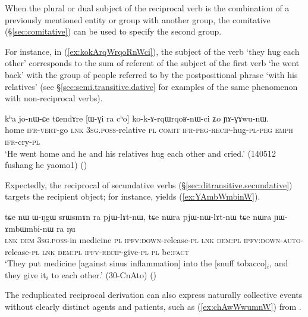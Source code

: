 When the plural or dual subject of the reciprocal verb is the combination of a previously mentioned entity or group with another group, the comitative  (§\ref{sec:comitative})  can be used to specify the second group. 

For instance, in (\ref{ex:kokArqWrqoRnWci}), the subject of the verb  `they hug each other' corresponds to the sum of referent of the subject of the first verb  `he went back' with the group of people referred to by the postpositional phrase  `with his relatives' (see §\ref{sec:semi.transitive.dative} for examples of the same phenomenon with non-reciprocal verbs).

\begin{exe}
\ex \label{ex:kokArqWrqoRnWci}
\gll   kʰa jo-nɯ-ɕe tɕendɤre [ɯ-ɣi ra cʰo] ko-k-ɤ-rqɯ\redp{}rqoʁ-nɯ-ci ʑo ɲɤ-ɣɤwu-nɯ. \\
home \textsc{ifr}-\textsc{vert}-go \textsc{lnk} \textsc{3sg}.\textsc{poss}-relative \textsc{pl} \textsc{comit} \textsc{ifr}-\textsc{peg}-\textsc{recip}-hug-\textsc{pl}-\textsc{peg} \textsc{emph} \textsc{ifr}-cry-\textsc{pl} \\
\glt `He went home and he and his relatives hug each other and cried.' (140512 fushang he yaomo1)
()
\end{exe}

Expectedly, the reciprocal of secundative verbs (§\ref{sec:ditransitive.secundative}) targets the recipient object; for instance,  yields  (\ref{ex:YAmbWmbinW}).

\begin{exe}
\ex \label{ex:YAmbWmbinW}
\gll tɕe nɯ ɯ-ŋgɯ srɯsmɤn ra pjɯ-lɤt-nɯ, tɕe nɯra pjɯ-nɯ-lɤt-nɯ tɕe nɯra ɲɯ-ɤmbɯ\redp{}mbi-nɯ ra ŋu \\
\textsc{lnk} \textsc{dem} \textsc{3sg}.\textsc{poss}-in medicine \textsc{pl} \textsc{ipfv}:\textsc{down}-release-\textsc{pl} \textsc{lnk} \textsc{dem}:\textsc{pl} \textsc{ipfv}:\textsc{down}-\textsc{auto}-release-\textsc{pl} \textsc{lnk} \textsc{dem}:\textsc{pl} \textsc{ipfv}-\textsc{recip}-give-\textsc{pl} \textsc{pl} be:\textsc{fact} \\
\glt `They put medicine [against sinus inflammation] into the [snuff tobacco]$_i$, and they give it$_i$ to each other.' (30-CnAto)
()
\end{exe}
 
The reduplicated reciprocal derivation can also express naturally collective events without clearly distinct agents and patients, such as  (\ref{ex:chAwWwumnW}) from .

